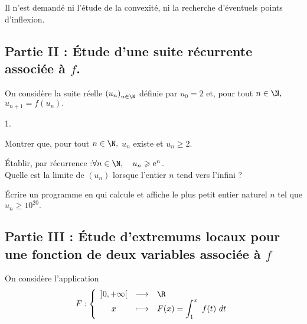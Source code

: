 \documentclass[11pt]{article}%
\begin{document}
Il n'est demandé ni l'étude de la convexité, ni la recherche
d'éventuels points d'inflexion.

\subsection*{Partie II : Étude d'une suite récurrente associée
à $f$.}

\noindent
On considère la suite réelle $\left( u_{n}\right) _{n\in \N}$
définie par $u_{0} = 2$ et, pour tout $n\in \N,$ $u_{n + 1} = f\left(
u_{n}\right).$

\begin{noliste}{1.}
 \setlength{\itemsep}{4mm}
 \setcounter{enumi}{7}
\item Montrer que, pour tout $n\in \N,$ $u_{n}$ existe et $u_{n}\geq2$.

\item Établir, par récurrence :\qquad$\forall n\in \N,\quad
u_{n}\geq \ee^{n}$.\\
Quelle est la limite de $(u_n)$ lorsque l'entier $n$ tend vers l'infini
?

\item Écrire un programme en \Scilab{} qui calcule et affiche le plus
petit entier naturel $n$ tel que $u_{n} \geq 10^{20}.$
\end{noliste}

\newpage

\subsection*{Partie III : Étude d'extremums locaux pour une fonction de
deux variables associée à $f$}

\noindent
On considère l'application
\[
F :
\left\{
\begin{array}{ccl}
\left] 0, + \infty \right[ & \longrightarrow & \R
\\
x & \longmapsto & F(x) = \dint{1}{x}f( t)\ dt
\end{array}
\right.
\]
\end{document}
